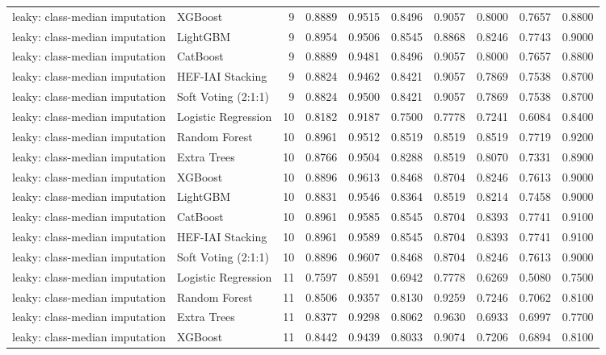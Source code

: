 \begin{tabular}{llrrrrrrrr}
leaky: class-median imputation & XGBoost & 9 & 0.8889 & 0.9515 & 0.8496 & 0.9057 & 0.8000 & 0.7657 & 0.8800 \\
leaky: class-median imputation & LightGBM & 9 & 0.8954 & 0.9506 & 0.8545 & 0.8868 & 0.8246 & 0.7743 & 0.9000 \\
leaky: class-median imputation & CatBoost & 9 & 0.8889 & 0.9481 & 0.8496 & 0.9057 & 0.8000 & 0.7657 & 0.8800 \\
leaky: class-median imputation & HEF-IAI Stacking & 9 & 0.8824 & 0.9462 & 0.8421 & 0.9057 & 0.7869 & 0.7538 & 0.8700 \\
leaky: class-median imputation & Soft Voting (2:1:1) & 9 & 0.8824 & 0.9500 & 0.8421 & 0.9057 & 0.7869 & 0.7538 & 0.8700 \\
leaky: class-median imputation & Logistic Regression & 10 & 0.8182 & 0.9187 & 0.7500 & 0.7778 & 0.7241 & 0.6084 & 0.8400 \\
leaky: class-median imputation & Random Forest & 10 & 0.8961 & 0.9512 & 0.8519 & 0.8519 & 0.8519 & 0.7719 & 0.9200 \\
leaky: class-median imputation & Extra Trees & 10 & 0.8766 & 0.9504 & 0.8288 & 0.8519 & 0.8070 & 0.7331 & 0.8900 \\
leaky: class-median imputation & XGBoost & 10 & 0.8896 & 0.9613 & 0.8468 & 0.8704 & 0.8246 & 0.7613 & 0.9000 \\
leaky: class-median imputation & LightGBM & 10 & 0.8831 & 0.9546 & 0.8364 & 0.8519 & 0.8214 & 0.7458 & 0.9000 \\
leaky: class-median imputation & CatBoost & 10 & 0.8961 & 0.9585 & 0.8545 & 0.8704 & 0.8393 & 0.7741 & 0.9100 \\
leaky: class-median imputation & HEF-IAI Stacking & 10 & 0.8961 & 0.9589 & 0.8545 & 0.8704 & 0.8393 & 0.7741 & 0.9100 \\
leaky: class-median imputation & Soft Voting (2:1:1) & 10 & 0.8896 & 0.9607 & 0.8468 & 0.8704 & 0.8246 & 0.7613 & 0.9000 \\
leaky: class-median imputation & Logistic Regression & 11 & 0.7597 & 0.8591 & 0.6942 & 0.7778 & 0.6269 & 0.5080 & 0.7500 \\
leaky: class-median imputation & Random Forest & 11 & 0.8506 & 0.9357 & 0.8130 & 0.9259 & 0.7246 & 0.7062 & 0.8100 \\
leaky: class-median imputation & Extra Trees & 11 & 0.8377 & 0.9298 & 0.8062 & 0.9630 & 0.6933 & 0.6997 & 0.7700 \\
leaky: class-median imputation & XGBoost & 11 & 0.8442 & 0.9439 & 0.8033 & 0.9074 & 0.7206 & 0.6894 & 0.8100 \\

\end{tabular}
